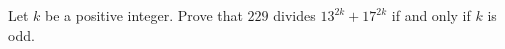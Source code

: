 Let $k$ be a positive integer. Prove that $229$ divides $13^{2k}+17^{2k}$ if and only if $k$ is odd.
